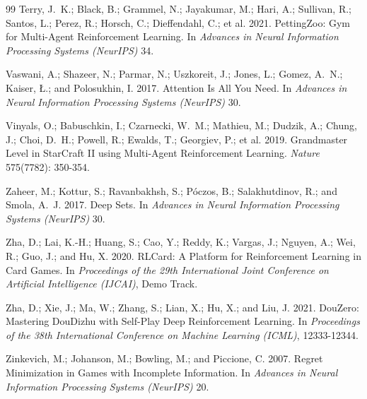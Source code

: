 \documentclass[letterpaper]{article} %
\begin{document}
\begin{thebibliography}{99}
Terry, J.~K.; Black, B.; Grammel, N.; Jayakumar, M.; Hari, A.; Sullivan, R.;
Santos, L.; Perez, R.; Horsch, C.; Dieffendahl, C.; et al. 2021.
PettingZoo: Gym for Multi-Agent Reinforcement Learning.
In \emph{Advances in Neural Information Processing Systems (NeurIPS)} 34.

Vaswani, A.; Shazeer, N.; Parmar, N.; Uszkoreit, J.; Jones, L.; Gomez, A.~N.;
Kaiser, \L.; and Polosukhin, I. 2017.
Attention Is All You Need.
In \emph{Advances in Neural Information Processing Systems (NeurIPS)} 30.

Vinyals, O.; Babuschkin, I.; Czarnecki, W.~M.; Mathieu, M.; Dudzik, A.; Chung, J.;
Choi, D.~H.; Powell, R.; Ewalds, T.; Georgiev, P.; et al. 2019.
Grandmaster Level in StarCraft II using Multi-Agent Reinforcement Learning.
\emph{Nature} 575(7782): 350-354.

Zaheer, M.; Kottur, S.; Ravanbakhsh, S.; P\'{o}czos, B.; Salakhutdinov, R.; and
Smola, A.~J. 2017.
Deep Sets.
In \emph{Advances in Neural Information Processing Systems (NeurIPS)} 30.

Zha, D.; Lai, K.-H.; Huang, S.; Cao, Y.; Reddy, K.; Vargas, J.; Nguyen, A.; Wei,
R.; Guo, J.; and Hu, X. 2020.
RLCard: A Platform for Reinforcement Learning in Card Games.
In \emph{Proceedings of the 29th International Joint Conference on Artificial
Intelligence (IJCAI)}, Demo Track.

Zha, D.; Xie, J.; Ma, W.; Zhang, S.; Lian, X.; Hu, X.; and Liu, J. 2021.
DouZero: Mastering DouDizhu with Self-Play Deep Reinforcement Learning.
In \emph{Proceedings of the 38th International Conference on Machine Learning
(ICML)}, 12333-12344.

Zinkevich, M.; Johanson, M.; Bowling, M.; and Piccione, C. 2007.
Regret Minimization in Games with Incomplete Information.
In \emph{Advances in Neural Information Processing Systems (NeurIPS)} 20.

\end{thebibliography}
\end{document}
